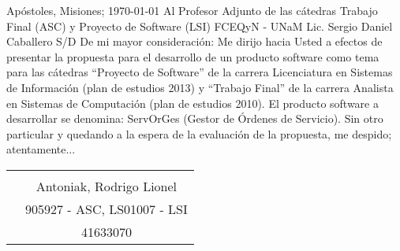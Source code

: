 \null\hfill
\normalsize{
Ap\'ostoles, Misiones; \today
}
\vspace{0.5cm}
\newline
\normalsize{
Al Profesor Adjunto de las c\'atedras
}
\newline
\normalsize{
Trabajo Final (ASC) y Proyecto de Software (LSI)
}
\newline
\normalsize{
FCEQyN - UNaM
}
\newline
\normalsize{
Lic. Sergio Daniel Caballero
}
\newline
\normalsize{
S/D
}
\vspace{0.5cm}
\newline
\normalsize{
De mi mayor consideración:
}
\vspace{0.5cm}
\newline
\setlength\parindent{5.5cm}
\normalsize{ \indent
Me dirijo hacia Usted a efectos de presentar la
propuesta para el desarrollo de un producto software
como tema para las c\'atedras “Proyecto de Software”
de la carrera Licenciatura en Sistemas de Informaci\'on
(plan de estudios 2013) y “Trabajo Final” de la carrera
Analista en Sistemas de Computaci\'on (plan de estudios
2010).
}
\newline
\normalsize{ \indent
El producto software a desarrollar se denomina:
ServOrGes (Gestor de \'Ordenes de Servicio).
}
\newline
\normalsize{ \indent
Sin otro particular y quedando a la espera de la
evaluaci\'on de la propuesta, me despido; atentamente...
}
\vspace{5cm}
\newline
\setlength\parindent{0.5cm}
\begin{tabular}{ p{7cm} c }
	\vspace{0.25cm} & \underline{\hspace{6cm}} \\ 
	\vspace{0.25cm} & Antoniak, Rodrigo Lionel \\ 
	\vspace{0.25cm} & 905927 - ASC, LS01007 - LSI \\  
	\vspace{0.25cm} & 41633070
\end{tabular}

